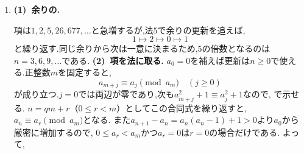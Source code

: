 \begin{enumerate}[label=\textbf{問\arabic*.},leftmargin=3.8em,format=\bookitemlink{practice-entrance}{solution}{problem}]
                  $(2,1,D_2,\ldots,D_{n-1})$となる.
                  最後の$(2,1)$を交換すれば,元の成否と縮約先の成否が一致する.
                  逆に,先頭が$1$でない成功配置で数字$2$以上を$1$増やし,先頭に$2$を戻せば一意に復元できる.
                  先頭が$1$の成功配置は\textcircled{1}の対応から$c_{n-2}$通りなので,
                  \textcircled{3}は$c_{n-1}-c_{n-2}$通りとなる.
                  \par\textbf{\textcircled{4}の数え方.}
                  最初の二枚を交換すれば\textcircled{3}に一対一で対応し,最初の比較後は同じ配列になる.
                  よってこちらも$c_{n-1}-c_{n-2}$通りであり,
                  \[
                    c_n=2c_{n-1}+2(c_{n-1}-c_{n-2})
                       =4c_{n-1}-2c_{n-2}.
                  \]
                  引いた$c_{n-2}$は,\textcircled{3}の縮約先から除く「先頭が$1$の配置」の数である.
                  \smallskip\textbf{(3)~個数から3項型へ.}
                  $x^2-4x+2=0$の根は$2\pm\sqrt2$である.
                  \[
                    c_n=P(2+\sqrt2)^{n-1}+Q(2-\sqrt2)^{n-1}
                  \]
                  に$c_1=1,c_2=2$を入れると$P=Q=1/2$であり,解答の式を得る.
                  $c_4=20,c_5=68$となる.二つのべきで$\sqrt2$の奇数次の項が相殺され,個数は整数になる.
                  この問の中心は,解く前の「何を取り除き,どう戻すか」という設計にある.
          \item \textbf{(1)~余りの.}\par\nobreak
                  項は$1,2,5,26,677,\ldots$と急増するが,法$5$で余りの更新を追えば,
                  \[
                    1\longmapsto2\longmapsto0\longmapsto1
                  \]
                  と繰り返す.同じ余りから次は一意に決まるため,$5$の倍数となるのは$n=3,6,9,\ldots$である.
                  \smallskip\textbf{(2)~項を法に取る.}
                  $a_0=0$を補えば更新は$n\ge0$で使える.正整数$m$を固定すると,
                  \[
                    a_{m+j}\equiv a_j\pmod{a_m}\quad(j\ge0)
                  \]
                  が成り立つ.$j=0$では両辺が零であり,次も$a_{m+j}^2+1\equiv a_j^2+1$なので,
                  で示せる.
                  $n=qm+r$（$0\le r<m$）としてこの合同式を繰り返すと,
                  $a_n\equiv a_r\pmod{a_m}$となる.
                  また$a_{n+1}-a_n=a_n(a_n-1)+1>0$より$a_0$から厳密に増加するので,
                  $0\le a_r<a_m$かつ$a_r=0$は$r=0$の場合だけである.
                  よって,
                  \[
                    \begin{aligned}

\end{aligned}\]
\end{enumerate}
